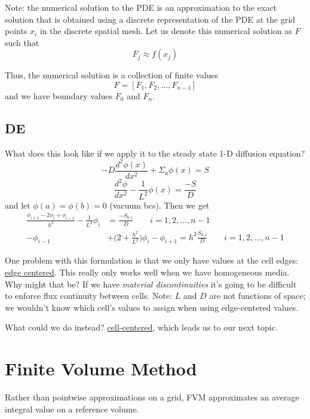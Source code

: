 \documentclass[12pt]{article}
\begin{document}
Note: the numerical solution to the PDE is an approximation to the exact solution that is obtained using a discrete representation of the PDE at the grid points $x_i$ in the discrete spatial mesh. Let us denote this numerical solution as $F$ such that 
$$F_j \approx f(x_j)$$ 

Thus, the numerical solution is a collection of finite values
$$F = [F_1, F_2, \dots, F_{n-1}]$$
and we have boundary values $F_0$ and $F_n$.


\subsection{DE}
What does this look like if we apply it to the steady state 1-D diffusion equation?
\[-D\frac{d^2 \phi(x)}{dx^2} + \Sigma_a \phi(x) = S\]
\[\frac{d^2 \phi}{dx^2} - \frac{1}{L^2}\phi(x) = \frac{-S}{D}\]
and let $\phi(a) = \phi(b) = 0$ (vacuum bcs). Then we get
\begin{align}
\frac{\phi_{i+1} - 2\phi_i + \phi_{i-1}}{h^2} - \frac{1}{L^2}\phi_i &= \frac{-S_{0,i}}{D} \qquad i = 1, 2, \dots, n-1 \nonumber \\
%
-\phi_{i-1} &+ \bigl(2 + \frac{h^2}{L^2}\bigr)\phi_i - \phi_{i+1} = h^2 \frac{S_{0,i}}{D} \qquad i = 1, 2, \dots, n-1 \nonumber
\end{align}

One problem with this formulation is that we only have values at the cell edges: \underline{edge centered}. This really only works well when we have homogeneous media. Why might that be? If we have \textit{material discontinuities} it's going to be difficult to enforce flux continuity between cells. Note: $L$ and $D$ are not functions of space; we wouldn't know which cell's values to assign when using edge-centered values. 

What could we do instead? \underline{cell-centered}, which leads us to our next topic.


\section{Finite Volume Method}
Rather than pointwise approximations on a grid, FVM approximates an average integral value on a reference volume.

%
\begin{center}
\end{center}
\end{document}
